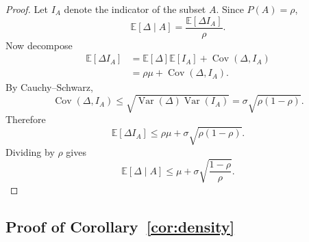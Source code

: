 \documentclass{article}
\newcommand{\EE}{\mathbb{E}}
\begin{document}
\begin{proof}
Let $I_A$ denote the indicator of the subset $A$. Since $P(A)=\rho$,
\begin{equation}
    \EE[\Delta \mid A]
    =
    \frac{\EE[\Delta I_A]}{\rho}.
\end{equation}
Now decompose
\begin{align}
    \EE[\Delta I_A]
    &=
    \EE[\Delta]\EE[I_A]
    +
    \operatorname{Cov}(\Delta, I_A) \\
    &=
    \rho \mu + \operatorname{Cov}(\Delta, I_A).
\end{align}
By Cauchy--Schwarz,
\begin{equation}
    \operatorname{Cov}(\Delta, I_A)
    \le
    \sqrt{\operatorname{Var}(\Delta)\operatorname{Var}(I_A)}
    =
    \sigma \sqrt{\rho(1-\rho)}.
\end{equation}
Therefore
\begin{equation}
    \EE[\Delta I_A]
    \le
    \rho \mu + \sigma \sqrt{\rho(1-\rho)}.
\end{equation}
Dividing by $\rho$ gives
\begin{equation}
    \EE[\Delta \mid A]
    \le
    \mu + \sigma \sqrt{\frac{1-\rho}{\rho}}.
\end{equation}
\end{proof}

\subsection{Proof of Corollary~\ref{cor:density}}
\end{document}
